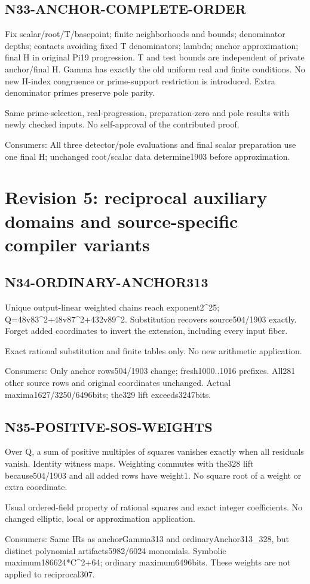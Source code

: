 \documentclass{article}
\begin{document}
\subsection{N33-ANCHOR-COMPLETE-ORDER}
\label{outline:r4-n33-anchor-complete-order}
Fix scalar/root/T/basepoint; finite neighborhoods and bounds; denominator depths; contacts avoiding fixed T denominators; lambda; anchor approximation; final H in original Pi19 progression. T and test bounds are independent of private anchor/final H. Gamma has exactly the old uniform real and finite conditions. No new H-index congruence or prime-support restriction is introduced. Extra denominator primes preserve pole parity.
\par Same prime-selection, real-progression, preparation-zero and pole results with newly checked inputs. No self-approval of the contributed proof.
\par Consumers: All three detector/pole evaluations and final scalar preparation use one final H; unchanged root/scalar data determine1903 before approximation.
\section{Revision 5: reciprocal auxiliary domains and source-specific compiler variants}
\subsection{N34-ORDINARY-ANCHOR313}
\label{outline:r5-n34-ordinary-anchor313}
Unique output-linear weighted chains reach exponent2\textasciicircum{}25; Q=48v83\textasciicircum{}2+48v87\textasciicircum{}2+432v89\textasciicircum{}2. Substitution recovers source504/1903 exactly. Forget added coordinates to invert the extension, including every input fiber.
\par Exact rational substitution and finite tables only. No new arithmetic application.
\par Consumers: Only anchor rows504/1903 change; fresh1000..1016 prefixes. All281 other source rows and original coordinates unchanged. Actual maxima1627/3250/6496bits; the329 lift exceeds3247bits.
\subsection{N35-POSITIVE-SOS-WEIGHTS}
\label{outline:r5-n35-positive-sos-weights}
Over Q, a sum of positive multiples of squares vanishes exactly when all residuals vanish. Identity witness maps. Weighting commutes with the328 lift because504/1903 and all added rows have weight1. No square root of a weight or extra coordinate.
\par Usual ordered-field property of rational squares and exact integer coefficients. No changed elliptic, local or approximation application.
\par Consumers: Same IRs as anchorGamma313 and ordinaryAnchor313\_328, but distinct polynomial artifacts5982/6024 monomials. Symbolic maximum186624*C\textasciicircum{}2+64; ordinary maximum6496bits. These weights are not applied to reciprocal307.
\end{document}
